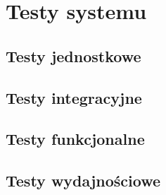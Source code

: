 \chapter{Testy systemu}
\section{Testy jednostkowe}
\section{Testy integracyjne}
\section{Testy funkcjonalne}
\section{Testy wydajnościowe}
